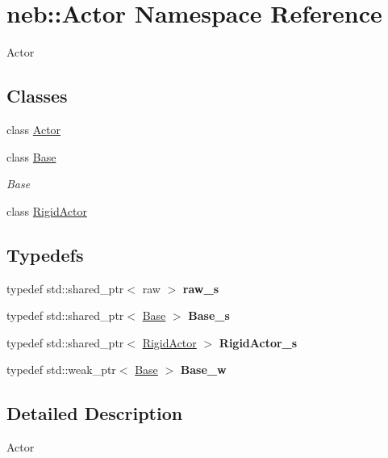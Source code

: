\hypertarget{namespaceneb_1_1Actor}{
\section{neb::Actor Namespace Reference}
\label{namespaceneb_1_1Actor}
}


Actor  
\subsection*{Classes}
\begin{DoxyCompactItemize}
\item 
class \hyperlink{classneb_1_1Actor_1_1Actor}{Actor}
\item 
class \hyperlink{classneb_1_1Actor_1_1Base}{Base}
\begin{DoxyCompactList}\small\item\em Base \item\end{DoxyCompactList}\item 
class \hyperlink{classneb_1_1Actor_1_1RigidActor}{RigidActor}
\end{DoxyCompactItemize}
\subsection*{Typedefs}
\begin{DoxyCompactItemize}
\item 
\hypertarget{namespaceneb_1_1Actor_a30566a1a7dabe4decbe2a838107249c9}{
typedef std::shared\_\-ptr$<$ raw $>$ {\bfseries raw\_\-s}}
\label{namespaceneb_1_1Actor_a30566a1a7dabe4decbe2a838107249c9}

\item 
\hypertarget{namespaceneb_1_1Actor_af59a7cb82a0c7bb45c173613a9a8ede8}{
typedef std::shared\_\-ptr$<$ \hyperlink{classneb_1_1Actor_1_1Base}{Base} $>$ {\bfseries Base\_\-s}}
\label{namespaceneb_1_1Actor_af59a7cb82a0c7bb45c173613a9a8ede8}

\item 
\hypertarget{namespaceneb_1_1Actor_a7eca8c7ed010423d06109cb1c891086b}{
typedef std::shared\_\-ptr$<$ \hyperlink{classneb_1_1Actor_1_1RigidActor}{RigidActor} $>$ {\bfseries RigidActor\_\-s}}
\label{namespaceneb_1_1Actor_a7eca8c7ed010423d06109cb1c891086b}

\item 
\hypertarget{namespaceneb_1_1Actor_a4f7242176f765e5804b49628b0bdc983}{
typedef std::weak\_\-ptr$<$ \hyperlink{classneb_1_1Actor_1_1Base}{Base} $>$ {\bfseries Base\_\-w}}
\label{namespaceneb_1_1Actor_a4f7242176f765e5804b49628b0bdc983}

\end{DoxyCompactItemize}


\subsection{Detailed Description}
Actor 